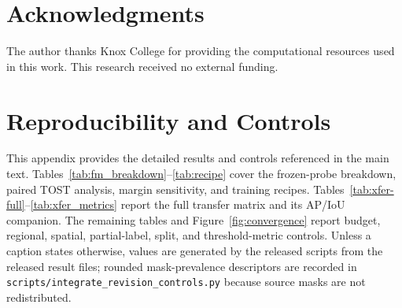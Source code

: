 \documentclass{article}
\begin{document}
\section*{Acknowledgments}
The author thanks Knox College for providing the computational resources used in this
work. This research received no external funding.




\appendix
\FloatBarrier
\raggedbottom
\section{Reproducibility and Controls}
\label{app:repro}

This appendix provides the detailed results and controls referenced in the main text.
Tables~\ref{tab:fm_breakdown}--\ref{tab:recipe} cover the frozen-probe breakdown,
paired TOST analysis, margin sensitivity, and training recipes.
Tables~\ref{tab:xfer-full}--\ref{tab:xfer_metrics} report the full transfer matrix
and its AP/IoU companion. The remaining tables and Figure~\ref{fig:convergence}
report budget, regional, spatial, partial-label, split, and threshold-metric controls.
Unless a caption states otherwise, values are generated by the released scripts from
the released result files; rounded mask-prevalence descriptors are recorded in
\verb|scripts/integrate_revision_controls.py| because source masks are not redistributed.
\end{document}
